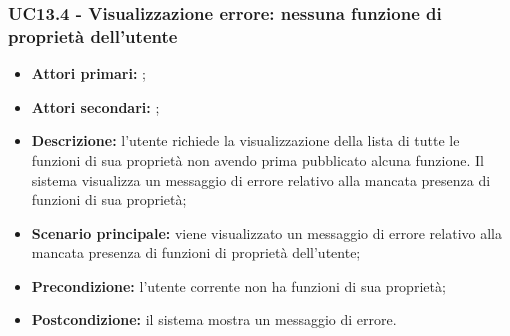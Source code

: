 \subsubsection{UC13.4 - Visualizzazione errore: nessuna funzione di proprietà dell’utente}
\begin{itemize}
	\item \textbf{Attori primari:} \us{};
	\item \textbf{Attori secondari:} \re{};
	\item \textbf{Descrizione:} l’utente richiede la visualizzazione della lista di tutte le funzioni di sua proprietà non avendo prima pubblicato alcuna funzione. Il sistema visualizza un messaggio di errore relativo alla mancata presenza di funzioni di sua proprietà;
	\item \textbf{Scenario principale:} viene visualizzato un messaggio di errore relativo alla mancata presenza di funzioni di proprietà dell’utente;
	\item \textbf{Precondizione:} l’utente corrente non ha funzioni di sua proprietà;
	\item \textbf{Postcondizione:} il sistema mostra un messaggio di errore.
\end{itemize}